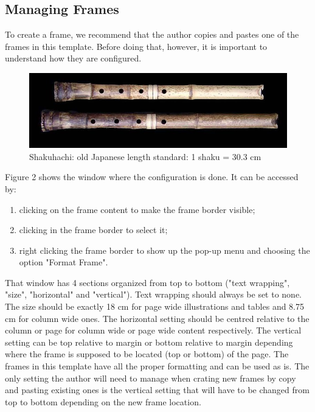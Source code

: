 \documentclass[10pt]{style_src/imeko_acta}
\begin{document}
\subsection{Managing Frames}

To create a frame, we recommend that the author copies and pastes one of the frames in this template. Before doing that, however, it is important to understand how they are configured. 

\begin{figure}[!t]
	\centering
	\includegraphics[width=.9\linewidth]{wide_image}
	\caption{Shakuhachi: old Japanese length standard: 1 shaku = 30.3 cm}
	\label{fig:wideimage}
\end{figure}

Figure 2 shows the window where the configuration is done. It can be accessed by: 
\begin{enumerate}
	\item clicking on the frame content to make the frame border visible;
	\item clicking in the frame border to select it;
	\item right clicking the frame border to show up the pop-up menu and choosing the option "Format Frame".
\end{enumerate}

That window has 4 sections organized from top to bottom ("text wrapping", "size", "horizontal" and "vertical"). 
Text wrapping should always be set to none. The size should be exactly 18 cm for page wide illustrations and tables and 8.75 cm for column wide ones. The horizontal setting should be centred relative to the column or page for column wide or page wide content respectively. The vertical setting can be top relative to margin or bottom relative to margin depending where the frame is supposed to be located (top or bottom) of the page.
The frames in this template have all the proper formatting and can be used as is. The only setting the author will need to manage when crating new frames by copy and pasting existing ones is the vertical setting that will have to be changed from top to bottom depending on the new frame location.
\end{document}
